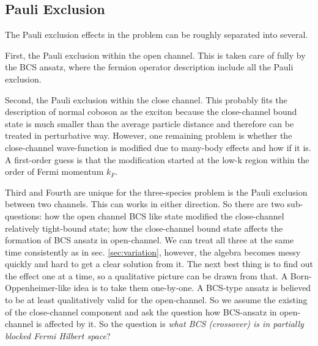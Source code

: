 \subsection{Pauli Exclusion\label{sec:20100908:idea}}
The Pauli exclusion effects in the problem can be roughly separated into several.  

First, the Pauli exclusion within the open channel.  This is taken care of fully by the BCS ansatz, where the fermion operator description include all the Pauli exclusion.  

Second, the Pauli exclusion within the close channel.  This probably fits the description of normal coboson as the exciton \cite{CobosonPhysicsReports} because the close-channel bound state is much smaller than the average particle distance and therefore can be treated in perturbative way.  However, one remaining problem is whether the close-channel wave-function is modified due to many-body effects and how if it is.  A first-order guess is that the modification started at the low-k region within the order of Fermi momentum $k_{F}$.  

Third and Fourth are unique for the three-species problem is the Pauli exclusion between two channels.  This can works in either direction.  So there are two sub-questions:  how the open channel BCS like state modified the close-channel relatively tight-bound state; how the close-channel bound state affects the formation of BCS ansatz in open-channel.  We can treat all three at the same time consistently as in sec. \ref{sec:variation}, however, the algebra becomes messy quickly and hard to get a clear solution from it.  The next best thing is to find out the effect one at a time, so a qualitative picture can be drawn from that.   A Born-Oppenheimer-like idea is to take them one-by-one.    A BCS-type ansatz is believed to be at least qualitatively valid for the open-channel. So we assume the existing of the close-channel  component and ask the question how BCS-ansatz in open-channel is affected by it.  So the question is \emph{what BCS  (crossover) is in  partially blocked Fermi Hilbert space}? 
 
